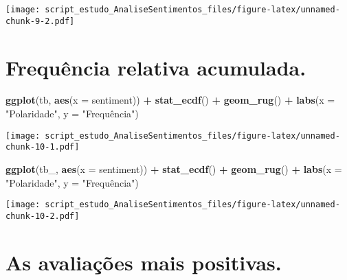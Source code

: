\documentclass[
]{article}
\newenvironment{Shaded}{\begin{snugshade}}{\end{snugshade}}
\newcommand{\DataTypeTok}[1]{\textcolor[rgb]{0.13,0.29,0.53}{#1}}
\newcommand{\KeywordTok}[1]{\textcolor[rgb]{0.13,0.29,0.53}{\textbf{#1}}}
\newcommand{\NormalTok}[1]{#1}
\newcommand{\OperatorTok}[1]{\textcolor[rgb]{0.81,0.36,0.00}{\textbf{#1}}}
\newcommand{\StringTok}[1]{\textcolor[rgb]{0.31,0.60,0.02}{#1}}
\begin{document}
\texttt{[image: script\_estudo\_AnaliseSentimentos\_files/figure-latex/unnamed-chunk-9-2.pdf]}

\hypertarget{frequuxeancia-relativa-acumulada.}{%
\section{Frequência relativa
acumulada.}\label{frequuxeancia-relativa-acumulada.}}

\begin{Shaded}
\begin{Highlighting}[]
\KeywordTok{ggplot}\NormalTok{(tb, }\KeywordTok{aes}\NormalTok{(}\DataTypeTok{x =}\NormalTok{ sentiment)) }\OperatorTok{+}
\StringTok{    }\KeywordTok{stat_ecdf}\NormalTok{() }\OperatorTok{+}
\StringTok{    }\KeywordTok{geom_rug}\NormalTok{() }\OperatorTok{+}
\StringTok{    }\KeywordTok{labs}\NormalTok{(}\DataTypeTok{x =} \StringTok{"Polaridade"}\NormalTok{, }\DataTypeTok{y =} \StringTok{"Frequência")}
\end{Highlighting}
\end{Shaded}

\texttt{[image: script\_estudo\_AnaliseSentimentos\_files/figure-latex/unnamed-chunk-10-1.pdf]}

\begin{Shaded}
\begin{Highlighting}[]
\KeywordTok{ggplot}\NormalTok{(tb_, }\KeywordTok{aes}\NormalTok{(}\DataTypeTok{x =}\NormalTok{ sentiment)) }\OperatorTok{+}
\StringTok{    }\KeywordTok{stat_ecdf}\NormalTok{() }\OperatorTok{+}
\StringTok{    }\KeywordTok{geom_rug}\NormalTok{() }\OperatorTok{+}
\StringTok{    }\KeywordTok{labs}\NormalTok{(}\DataTypeTok{x =} \StringTok{"Polaridade"}\NormalTok{, }\DataTypeTok{y =} \StringTok{"Frequência")}
\end{Highlighting}
\end{Shaded}

\texttt{[image: script\_estudo\_AnaliseSentimentos\_files/figure-latex/unnamed-chunk-10-2.pdf]}

\hypertarget{as-avaliauxe7uxf5es-mais-positivas.}{%
\section{As avaliações mais
positivas.}\label{as-avaliauxe7uxf5es-mais-positivas.}}
\end{document}
